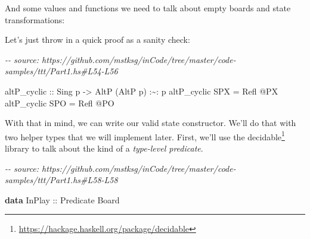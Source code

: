 \documentclass[]{article}
\newenvironment{Shaded}{}{}
\newcommand{\CommentTok}[1]{\textcolor[rgb]{0.38,0.63,0.69}{\textit{#1}}}
\newcommand{\DataTypeTok}[1]{\textcolor[rgb]{0.56,0.13,0.00}{#1}}
\newcommand{\KeywordTok}[1]{\textcolor[rgb]{0.00,0.44,0.13}{\textbf{#1}}}
\newcommand{\NormalTok}[1]{#1}
\newcommand{\OperatorTok}[1]{\textcolor[rgb]{0.40,0.40,0.40}{#1}}
\newcommand{\OtherTok}[1]{\textcolor[rgb]{0.00,0.44,0.13}{#1}}
\renewcommand{\href}[2]{#2\footnote{\url{#1}}}
\begin{document}
And some values and functions we need to talk about empty boards and state
transformations:

\begin{Shaded}
\end{Shaded}

Let's just throw in a quick proof as a sanity check:

\begin{Shaded}
\begin{Highlighting}[]
\CommentTok{{-}{-} source: https://github.com/mstksg/inCode/tree/master/code{-}samples/ttt/Part1.hs\#L54{-}L56}

\OtherTok{altP\_cyclic ::} \DataTypeTok{Sing}\NormalTok{ p }\OtherTok{{-}\textgreater{}} \DataTypeTok{AltP}\NormalTok{ (}\DataTypeTok{AltP}\NormalTok{ p) }\OperatorTok{:\textasciitilde{}:}\NormalTok{ p}
\NormalTok{altP\_cyclic }\DataTypeTok{SPX} \OtherTok{=} \DataTypeTok{Refl} \OperatorTok{@}\DataTypeTok{\textquotesingle{}PX}
\NormalTok{altP\_cyclic }\DataTypeTok{SPO} \OtherTok{=} \DataTypeTok{Refl} \OperatorTok{@}\DataTypeTok{\textquotesingle{}PO}
\end{Highlighting}
\end{Shaded}

With that in mind, we can write our valid state constructor. We'll do that with
two helper types that we will implement later. First, we'll use the
\href{https://hackage.haskell.org/package/decidable}{decidable} library to talk
about the kind of a \emph{type-level predicate}.

\begin{Shaded}
\begin{Highlighting}[]
\CommentTok{{-}{-} source: https://github.com/mstksg/inCode/tree/master/code{-}samples/ttt/Part1.hs\#L58{-}L58}

\KeywordTok{data} \DataTypeTok{InPlay}\OtherTok{ ::} \DataTypeTok{Predicate} \DataTypeTok{Board}
\end{Highlighting}
\end{Shaded}
\end{document}
